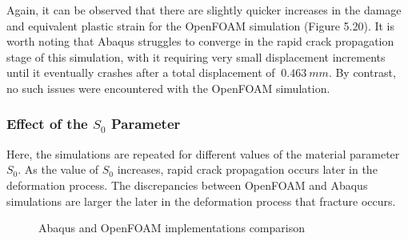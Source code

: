\documentclass[sn-mathphys,Numbered,draft]{sn-jnl}%
\begin{document}



Again, it can be observed that there are slightly quicker increases in the damage and equivalent plastic strain for the OpenFOAM simulation (Figure 5.20). It is worth noting that Abaqus struggles to converge in the rapid crack propagation stage of this simulation, with it requiring very small displacement increments until it eventually crashes after a total displacement of $~0.463\ mm$. By contrast, no such issues were encountered with the OpenFOAM simulation.


\subsubsection{Effect of the $S_0$ Parameter}

Here, the simulations are repeated for different values of the material parameter $S_0$.
As the value of $S_0$ increases, rapid crack propagation occurs later in the deformation process.
The discrepancies between OpenFOAM and Abaqus simulations are larger the later in the deformation process that fracture occurs.

\begin{figure}[htb]
	\centering
		
		\caption{Abaqus and OpenFOAM implementations comparison}
	\label{label_for_entire_figure}
\end{figure}
\FloatBarrier
\end{document}
